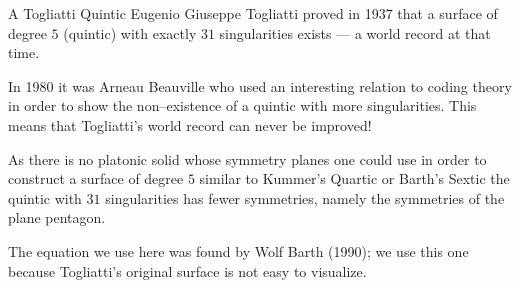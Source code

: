 \begin{surferPage}{A Togliatti Quintic}
    Eugenio Giuseppe Togliatti proved in 1937 that a surface of degree $5$ (quintic) with exactly $31$ singularities exists --- a world record at that time.


    In 1980 it was Arneau Beauville who used an interesting relation to coding
    theory in order to show the non--existence of a quintic with more
    singularities. 
    This means that Togliatti's world record can never be improved!

    As there is no platonic solid whose symmetry planes one could use in order
    to construct a surface of degree $5$ similar to Kummer's Quartic or
    Barth's Sextic the quintic with $31$ singularities has fewer symmetries,
    namely the symmetries of the plane pentagon.


 The equation we use here was found by Wolf Barth (1990); we use this one
    because Togliatti's original surface is not easy to visualize.
\end{surferPage}
